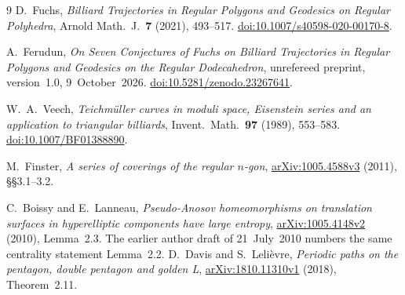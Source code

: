 \documentclass[11pt]{article}
\begin{document}
\begin{thebibliography}{9}
D.~Fuchs, \emph{Billiard Trajectories in Regular Polygons and Geodesics
on Regular Polyhedra}, Arnold Math.\ J.\ \textbf{7} (2021), 493--517.
\href{https://doi.org/10.1007/s40598-020-00170-8}
{doi:10.1007/s40598-020-00170-8}.

A.~Ferudun, \emph{On Seven Conjectures of Fuchs on Billiard Trajectories
in Regular Polygons and Geodesics on the Regular Dodecahedron},
unrefereed preprint, version~1.0, 9~October~2026.
\href{https://doi.org/10.5281/zenodo.23267641}
{doi:10.5281/zenodo.23267641}.

W.~A.~Veech, \emph{Teichm\"uller curves in moduli space, Eisenstein
series and an application to triangular billiards},
Invent.\ Math.\ \textbf{97} (1989), 553--583.
\href{https://doi.org/10.1007/BF01388890}{doi:10.1007/BF01388890}.

M.~Finster, \emph{A series of coverings of the regular $n$-gon},
\href{https://arxiv.org/abs/1005.4588v3}{arXiv:1005.4588v3} (2011),
\S\S3.1--3.2.

C.~Boissy and E.~Lanneau, \emph{Pseudo-Anosov homeomorphisms on
translation surfaces in hyperelliptic components have large entropy},
\href{https://arxiv.org/abs/1005.4148v2}{arXiv:1005.4148v2} (2010),
Lemma~2.3. The earlier author draft of 21~July~2010 numbers the
same centrality statement Lemma~2.2.
D.~Davis and S.~Leli\`evre, \emph{Periodic paths on the pentagon,
double pentagon and golden L},
\href{https://arxiv.org/abs/1810.11310v1}{arXiv:1810.11310v1} (2018),
Theorem~2.11.
\end{thebibliography}
\end{document}
